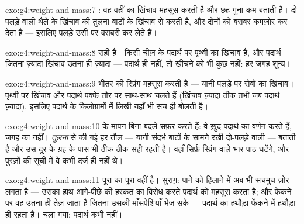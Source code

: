 \begin{solution}{exo:g4:weight-and-mass:7}
: वह वहीं का खिंचाव महसूस करती है और छह गुना कम बताती
है। दो-पलड़े वाली  थैले के खिंचाव की तुलना बाटों के खिंचाव से
करती है, और  दोनों को बराबर कमज़ोर कर देता है --- इसलिए पलड़े
उसी  पर बराबरी कर लेते हैं।
\end{solution}

\begin{solution}{exo:g4:weight-and-mass:8}
सही है।  किसी चीज़ के पदार्थ पर पृथ्वी का खिंचाव है, और पदार्थ
जितना ज़्यादा खिंचाव उतना ही ज़्यादा --- पदार्थ ही नहीं, तो खींचने को
भी कुछ नहीं:  हर जगह शून्य।
\end{solution}

\begin{solution}{exo:g4:weight-and-mass:9}
भीतर की स्प्रिंग \emph{} महसूस करती है --- यानी पलड़े पर सेबों का
खिंचाव। पृथ्वी पर खिंचाव और पदार्थ पक्के तौर पर साथ-साथ चलते हैं
(खिंचाव ज़्यादा ठीक तभी जब पदार्थ ज़्यादा), इसलिए पदार्थ के
किलोग्रामों में लिखी  यहाँ भी सच ही बोलती है।
\end{solution}

\begin{solution}{exo:g4:weight-and-mass:10}
 के मापन बिना बदले सफ़र करते हैं: वे ख़ुद पदार्थ का वर्णन
करते हैं, जगह का नहीं। \emph{तुलना} से की गई हर तौल --- यानी संदर्भ
बाटों के सामने रखी दो-पलड़े वाली  ---  बताती है और उस
दूर के ग्रह के पास भी ठीक-ठीक सही रहती है। वहाँ सिर्फ़ स्प्रिंग वाले
भार-पाठ घटेंगे, और पुरज़ों की सूची में वे कभी दर्ज ही नहीं थे।
\end{solution}

\begin{solution}{exo:g4:weight-and-mass:11}
 पूरा का पूरा वहीं है। सुराग़: पाने को हिलाने में अब भी
सचमुच ज़ोर लगता है --- उसका हाथ आगे-पीछे की हरकत का विरोध करते पदार्थ
को महसूस करता है; और फेंकने पर वह उतना ही तेज़ जाता है जितना उसकी
माँसपेशियाँ भेज सकें --- पदार्थ का हथौड़ा फेंकने में हथौड़ा ही रहता
है।  चला गया; पदार्थ कभी नहीं।
\end{solution}
